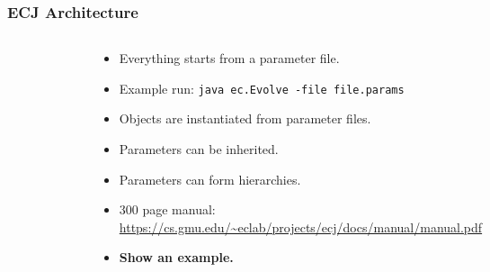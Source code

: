 \documentclass{beamer}
\begin{document}
\begin{frame}
	\frametitle{ECJ Architecture}
	\begin{columns}[c]
		\column{2in}
			\begin{figure}
				\centering
				\includegraphics[width=2in,keepaspectratio]{ecj-state.pdf}
			\end{figure}
		\column{3in}
		\begin{scriptsize}
			\begin{itemize}
				\setlength{\itemsep}{0.30cm}
				\item Everything starts from a parameter file.
				\item Example run: \texttt{java ec.Evolve -file file.params}
				\item Objects are instantiated from parameter files.
				\item Parameters can be inherited.
				\item Parameters can form hierarchies.
				\item 300 page manual: \url{https://cs.gmu.edu/~eclab/projects/ecj/docs/manual/manual.pdf}
				\item \textbf{Show an example.}
			\end{itemize}
		\end{scriptsize}
	\end{columns}
\end{frame}
\end{document}
